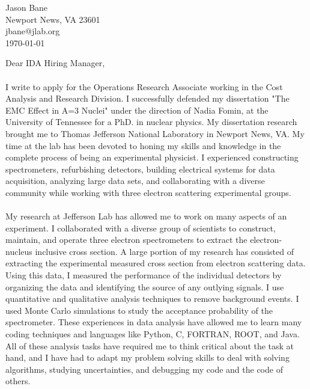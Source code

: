 \documentclass[12pt,letterpaper]{article}
\newcommand{\CPP}
{C\nolinebreak[4]\hspace{-.05em}\raisebox{.22ex}{\footnotesize\bf ++}}
\begin{document}
\vspace*{-1.2cm}
\noindent Jason Bane\\
Newport News, VA 23601 \\
jbane@jlab.org \\

\noindent\today\\

\noindent 

Dear IDA Hiring Manager, 

\paragraph{}I write to apply for the Operations Research Associate working in the Cost Analysis and Research Division. I successfully defended my dissertation "The EMC Effect in A=3 Nuclei" under the direction of Nadia Fomin, at the University of Tennessee for a PhD. in nuclear physics. My dissertation research brought me to Thomas Jefferson National Laboratory in Newport News, VA. My time at the lab has been devoted to honing my skills and knowledge in the complete process of being an experimental physicist. I experienced constructing spectrometers, refurbishing detectors, building electrical systems for data acquisition, analyzing large data sets, and collaborating with a diverse community while working with three electron scattering experimental groups.

\paragraph{}My research at Jefferson Lab has allowed me to work on many aspects of an experiment. I collaborated with a diverse group of scientists to construct, maintain, and operate three electron spectrometers to extract the electron-nucleus inclusive cross section. A large portion of my research has consisted of extracting the experimental measured cross section from electron scattering data. Using this data, I measured the performance of the individual detectors by organizing the data and identifying the source of any outlying signals. I use quantitative and qualitative analysis techniques to remove background events. I used Monte Carlo simulations to study the acceptance probability of the spectrometer. These experiences in data analysis have allowed me to learn many coding techniques and languages like Python, \CPP, FORTRAN, ROOT, and Java. All of these analysis tasks have required me to think critical about the task at hand, and I have had to adapt my problem solving skills to deal with solving algorithms, studying uncertainties, and debugging my code and the code of others.   
\end{document}
